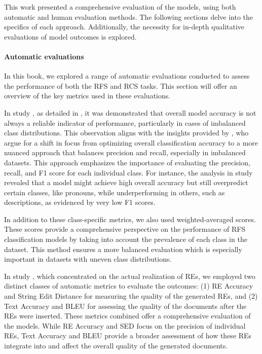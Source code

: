 This work presented a comprehensive evaluation of the \context models, using both automatic and human evaluation methods. The following sections delve into the specifics of each approach. Additionally, the necessity for in-depth qualitative evaluations of model outcomes is explored.

\paragraph*{Automatic evaluations}

In this book, we explored a range of automatic evaluations conducted to assess the performance of both the RFS and RCS tasks. This section will offer an overview of the key metrics used in these evaluations.
 
In study \studA, as detailed in , it was demonstrated that overall model accuracy is not always a reliable indicator of performance, particularly in cases of imbalanced class distributions. This observation aligns with the insights provided by \citet{padurariu2019dealing}, who argue for a shift in focus from optimizing overall classification accuracy to a more nuanced approach that balances precision and recall, especially in imbalanced datasets. This approach emphasizes the importance of evaluating the precision, recall, and F1 score for each individual class. For instance, the analysis in study \studA revealed that a model might achieve high overall accuracy but still overpredict certain classes, like pronouns, while underperforming in others, such as descriptions, as evidenced by very low F1 scores.

In addition to these class-specific metrics, we also used weighted-averaged scores. These scores provide a comprehensive perspective on the performance of RFS classification models by taking into account the prevalence of each class in the dataset. This method ensures a more balanced evaluation which is especially important in datasets with uneven class distributions.

In study \studF, which concentrated on the actual realization of REs, we employed two distinct classes of automatic metrics to evaluate the outcomes: (1) RE Accuracy and String Edit Distance \citep[SED,][]{Levenshtein_SPD66} for measuring the quality of the generated REs, and (2) Text Accuracy and BLEU \citep{papineni2002bleu} for assessing the quality of the documents after the REs were inserted. These metrics combined offer a comprehensive evaluation of the \context models. While RE Accuracy and SED focus on the precision of individual REs, Text Accuracy and BLEU provide a broader assessment of how these REs integrate into and affect the overall quality of the generated documents.

